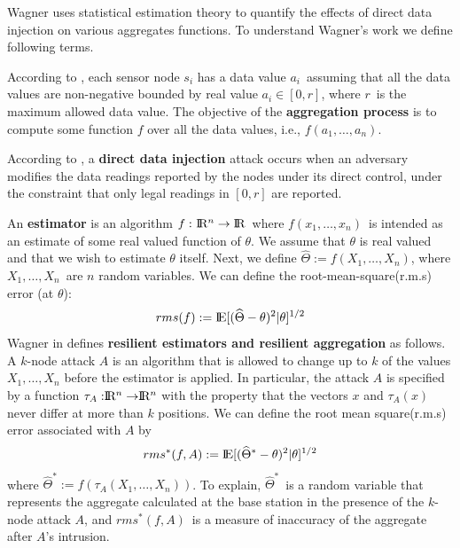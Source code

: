 	Wagner \cite{wagner2004resilient} uses statistical estimation theory to quantify the effects of direct data injection on various aggregates functions.
	To understand Wagner's work we define following terms. 
	\begin{definition}
		According to \cite{chan2006secure}, each sensor node $s_{i}$ has a data value $a_{i}$\ assuming that all the data values are non-negative bounded by real value $a_{i} \in [0,r]$, where $r$\ is the maximum allowed data value.
		The objective of the \textbf{aggregation process} is to compute some function $f$ over all the data values, i.e., $f (a_{1}, \dotsc ,a_{n})$.
	\end{definition}
	\begin{definition}
		\label{def:direct-data-injection}
		According to \cite{chan2006secure}, a \textbf{direct data injection} attack occurs when an adversary modifies the data readings reported by the nodes under its direct control, under the constraint that only legal readings in $[0, r]$ are reported.
	\end{definition}
	An \textbf{estimator} is an algorithm $ f :\ \R^n \rightarrow \rm I\!R$\ where $f(x_{1},\dotsc, x_{n})$\ is intended as an estimate of some real valued function of $\theta$.
	We assume that $\theta$ is real valued and that we wish to estimate $\theta$ itself.
	Next, we define $\widehat{\Theta} := f(X_{1},\dotsc,X_{n})$, where $X_{1},\dotsc,X_{n}$\ are $n$ random variables. We can define the root-mean-square(r.m.s)  error (at $\theta$):
	\begin{equation}
		rms(f) := \rm I\!E[(\widehat{\Theta} - \theta)^2 | \theta]^{1/2}
	\end{equation}
	Wagner in \cite{wagner2004resilient} defines \textbf{resilient estimators and resilient aggregation } as follows.
	A $k$-node attack $A$ is an algorithm that is allowed to change up to $k$ of the values $X_{1}, \dotsc, X_{n}$ before the estimator is applied.
	In particular, the attack $A$ is specified by a function $\tau_{A} : \R^n \rightarrow  \R^n $ with the property that the vectors $x$ and $\tau_{A}(x)$ never differ at more than $k$ positions.
	We can define the root mean square(r.m.s) error associated with $A$ by
	\begin{equation}
		rms^*(f,A) := \rm I\!E[(\widehat{\Theta}^* - \theta)^2 | \theta]^{1/2} 		  
	\end{equation}
	where $\widehat{\Theta}^* := f(\tau_{A}(X_{1},\dotsc,X_{n}))$.
	To explain, $\widehat{\Theta}^*$\ is a random variable that represents the aggregate calculated at the base station in the presence of the $k$-node attack $A$, and $rms^*(f,A)$\ is a measure of inaccuracy of the aggregate after $A$'s intrusion.
